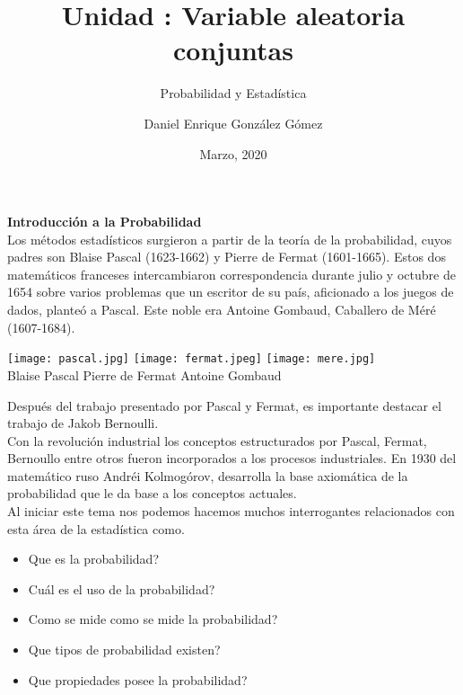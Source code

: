\documentclass[base=hide,12pt]{elegantbook}
\title{Unidad : Variable aleatoria conjuntas}
\subtitle{Probabilidad y Estadística}
\author{Daniel Enrique González Gómez}
\institute{Pontificia Universidad Javeriana Cali}
\date{Marzo, 2020}
\begin{document}
\textcolor{col4}{\LARGE \bf Introducción a la Probabilidad}    \\

Los métodos estadísticos surgieron a partir de la teoría de la probabilidad, cuyos padres son Blaise Pascal (1623-1662) y Pierre de Fermat (1601-1665). Estos dos matemáticos franceses intercambiaron correspondencia durante julio y octubre de 1654 sobre varios problemas que un escritor de su país, aficionado a los juegos de dados, planteó a Pascal. Este noble era Antoine Gombaud, Caballero de Méré (1607-1684).\\
\begin{center}
	\texttt{[image: pascal.jpg]} 
	\texttt{[image: fermat.jpeg]} 
	\texttt{[image: mere.jpg]}\\
	Blaise Pascal \hspace{1.8cm}
	Pierre de Fermat\hspace{1cm} 
	Antoine Gombaud\\
\end{center}

Después del trabajo presentado por Pascal y Fermat, es importante destacar  el trabajo de Jakob Bernoulli.\\

Con la  revolución industrial los conceptos estructurados por Pascal, Fermat, Bernoullo entre otros fueron incorporados a los procesos industriales. En 1930 del matemático ruso Andréi Kolmogórov, desarrolla la  base axiomática de la probabilidad que le da base a los conceptos actuales.\\

Al iniciar este tema nos podemos hacemos muchos interrogantes relacionados con esta área de la estadística como.
\begin{itemize}
  \item Que es la probabilidad?
  \item Cuál es el uso de la probabilidad?
  \item Como se mide como se mide la probabilidad?
  \item Que tipos de  probabilidad existen?
  \item Que propiedades  posee la probabilidad?
\end{itemize}
\end{document}

